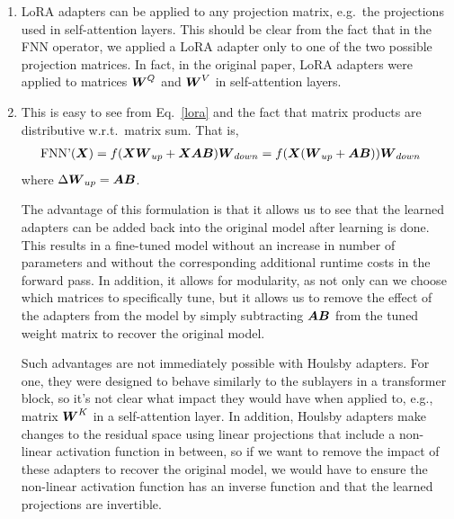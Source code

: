 \documentclass[11pt,a4paper]{article}
\newcommand\op[1]{\operatorname{#1}}
\begin{document}
\begin{enumerate}[label=(\alph*)]
\begin{align}
              \op{FNN'}(\mX) & = f(\mX\mW_{up} + \mX\mA\mB)\mW_{down}
          \end{align}
          The addition comes from the LoRA adapter, which is applied using a
          residual connection around the weight matrix we are fine-tuning.
          $\mA$ has $dr$ parameters and $\mB$ has $4dr$ parameters, for a total
          of $5dr$ for the entire adapter, where $r << d$ is the hyperparameter
          that controls the rank of both projection matrices used by LoRA
          adapters.
    \item LoRA adapters can be applied to any projection matrix, e.g.\ the
          projections used in self-attention layers. This should be clear from
          the fact that in the FNN operator, we applied a LoRA adapter only to
          one of the two possible projection matrices.
          In fact, in the original paper, LoRA adapters were applied to matrices
          ${\boldsymbol{W}}^Q$ and ${\boldsymbol{W}}^V$ in self-attention layers.
    \item This is easy to see from Eq.~\ref{lora} and the fact
          that matrix products are distributive w.r.t.\ matrix sum.
          That is,
          \begin{align}
              \op{FNN'}(\mX) & = f(\mX\mW_{up} + \mX\mA\mB)\mW_{down} = f(\mX(\mW_{up} + \mA\mB))\mW_{down}
          \end{align}
          where $\Delta{\boldsymbol{W}}_{up} = {\boldsymbol{A}}{\boldsymbol{B}}$.

          The advantage of this formulation is that it allows us to see that
          the learned adapters can be added back into the original model after
          learning is done. This results in a fine-tuned model without an
          increase in number of parameters and without the corresponding
          additional runtime costs in the forward pass.
          In addition, it allows for modularity, as not only can we choose which
          matrices to specifically tune, but it allows us to remove the effect
          of the adapters from the model by simply subtracting ${\boldsymbol{A}}{\boldsymbol{B}}$ from the
          tuned weight matrix to recover the original model.

          Such advantages are not immediately possible with Houlsby adapters.
          For one, they were designed to behave similarly to the sublayers in a
          transformer block, so it's not clear what impact they would have when
          applied to, e.g., matrix ${\boldsymbol{W}}^K$ in a self-attention layer.
          In addition, Houlsby adapters make changes to the residual space using
          linear projections that include a non-linear activation function in
          between, so if we want to remove the impact of these adapters to
          recover the original model, we would have to ensure the non-linear
          activation function has an inverse function and that the learned
          projections are invertible.

\end{enumerate}
\end{document}

